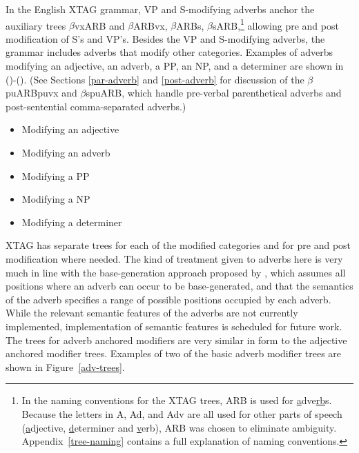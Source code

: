 {In the English XTAG grammar, VP and S-modifying adverbs anchor the
auxiliary trees $\beta$vxARB and $\beta$ARBvx, $\beta$ARBs,
$\beta$sARB,\footnote{In the naming conventions for the XTAG trees,
ARB is used for {\underline a}dve{\underline {rb}}s.  Because the
letters in A, Ad, and Adv are all used for other parts of speech
({\underline a}djective, {\underline d}eterminer and {\underline
v}erb), ARB was chosen to eliminate ambiguity.
Appendix~\ref{tree-naming} contains a full explanation of naming
conventions.}  allowing pre and post modification of S's and VP's.
Besides the VP and S-modifying adverbs, the grammar includes adverbs
that modify other categories. Examples of adverbs modifying an
adjective, an adverb, a PP, an NP, and a determiner are shown in
()-(). (See Sections \ref{par-adverb} and
\ref{post-adverb} for discussion of the $\beta$puARBpuvx and
$\beta$spuARB, which handle pre-verbal parenthetical adverbs and
post-sentential comma-separated adverbs.)

\begin{itemize}
\item{Modifying an adjective}

\item{Modifying an adverb}

\item{Modifying a PP}

\item{Modifying a NP}

\item{Modifying a determiner}

\end{itemize}

XTAG has separate trees for each of the modified categories and for pre and
post modification where needed.  The kind of treatment given to adverbs here is
very much in line with the base-generation approach proposed by \cite{Ernst84},
which assumes all positions where an adverb can occur to be base-generated, and
that the semantics of the adverb specifies a range of possible positions
occupied by each adverb. While the relevant semantic features of the adverbs
are not currently implemented, implementation of semantic features is scheduled
for future work.  The trees for adverb anchored modifiers are very similar in
form to the adjective anchored modifier trees.  Examples of two of the basic
adverb modifier trees are shown in Figure~\ref{adv-trees}.

}
